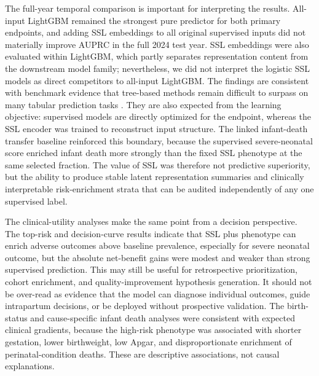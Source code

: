 \documentclass[pdflatex,sn-vancouver-num]{sn-jnl}
\begin{document}
The full-year temporal comparison is important for interpreting the results. All-input LightGBM remained the strongest pure predictor for both primary endpoints, and adding SSL embeddings to all original supervised inputs did not materially improve AUPRC in the full 2024 test year. SSL embeddings were also evaluated within LightGBM, which partly separates representation content from the downstream model family; nevertheless, we did not interpret the logistic SSL models as direct competitors to all-input LightGBM. The findings are consistent with benchmark evidence that tree-based methods remain difficult to surpass on many tabular prediction tasks \cite{grinsztajn2022tree}. They are also expected from the learning objective: supervised models are directly optimized for the endpoint, whereas the SSL encoder was trained to reconstruct input structure. The linked infant-death transfer baseline reinforced this boundary, because the supervised severe-neonatal score enriched infant death more strongly than the fixed SSL phenotype at the same selected fraction. The value of SSL was therefore not predictive superiority, but the ability to produce stable latent representation summaries and clinically interpretable risk-enrichment strata that can be audited independently of any one supervised label.

The clinical-utility analyses make the same point from a decision perspective. The top-risk and decision-curve results indicate that SSL plus phenotype can enrich adverse outcomes above baseline prevalence, especially for severe neonatal outcome, but the absolute net-benefit gains were modest and weaker than strong supervised prediction. This may still be useful for retrospective prioritization, cohort enrichment, and quality-improvement hypothesis generation. It should not be over-read as evidence that the model can diagnose individual outcomes, guide intrapartum decisions, or be deployed without prospective validation. The birth-status and cause-specific infant death analyses were consistent with expected clinical gradients, because the high-risk phenotype was associated with shorter gestation, lower birthweight, low Apgar, and disproportionate enrichment of perinatal-condition deaths. These are descriptive associations, not causal explanations.
\end{document}
